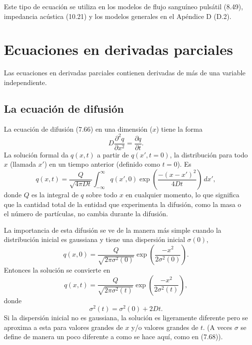 \documentclass[12pt,a4paper]{book}
\begin{document}
Este tipo de ecuación se utiliza en los modelos de flujo sanguíneo pulsátil (8.49), impedancia acústica (10.21) y los modelos generales en el Apéndice D (D.2).

\section{Ecuaciones en derivadas parciales}\label{sec:C.4}

Las ecuaciones en derivadas parciales contienen derivadas de más de una variable independiente.

\subsection*{La ecuación de difusión}

La ecuación de difusión (7.66) en una dimensión ($x$) tiene la forma
\begin{equation}
D \frac{\partial^2 q}{\partial x^2} = \frac{\partial q}{\partial t}.
\label{eq:C.36}
\end{equation}
La solución formal da $q(x, t)$ a partir de $q(x', t = 0)$, la distribución para todo $x$ (llamada $x'$) en un tiempo anterior (definido como $t = 0$). Es
\begin{equation}
q(x, t) = \frac{Q}{\sqrt{4\pi Dt}} \int_{-\infty}^{\infty} q(x', 0) \exp\left( \frac{-(x - x')^2}{4Dt} \right) \, dx',
\label{eq:C.37}
\end{equation}
donde $Q$ es la integral de $q$ sobre todo $x$ en cualquier momento, lo que significa que la cantidad total de la entidad que experimenta la difusión, como la masa o el número de partículas, no cambia durante la difusión.

La importancia de esta difusión se ve de la manera más simple cuando la distribución inicial es gaussiana y tiene una dispersión inicial $\sigma(0)$,
\begin{equation}
q(x, 0) = \frac{Q}{\sqrt{2\pi\sigma^2(0)}} \exp\left( \frac{-x^2}{2\sigma^2(0)} \right).
\label{eq:C.38}
\end{equation}
Entonces la solución se convierte en
\begin{equation}
q(x, t) = \frac{Q}{\sqrt{2\pi\sigma^2(t)}} \exp\left( \frac{-x^2}{2\sigma^2(t)} \right),
\label{eq:C.39}
\end{equation}
donde
\begin{equation}
\sigma^2(t) = \sigma^2(0) + 2Dt.
\label{eq:C.40}
\end{equation}
Si la dispersión inicial no es gaussiana, la solución es ligeramente diferente pero se aproxima a esta para valores grandes de $x$ y/o valores grandes de $t$. (A veces $\sigma$ se define de manera un poco diferente a como se hace aquí, como en (7.68)).
\end{document}
